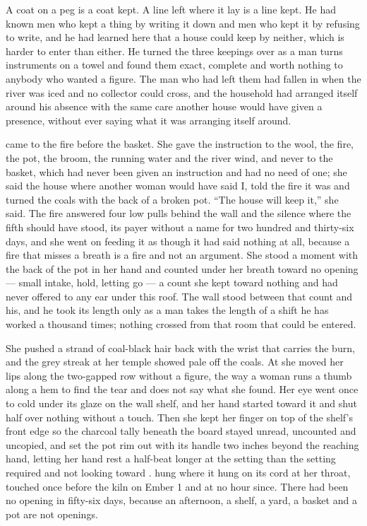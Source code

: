 A coat on a peg is a coat kept. A line left where it lay is a line kept. He had known men who kept a thing by writing it down and men who kept it by refusing to write, and he had learned here that a house could keep by neither, which is harder to enter than either. He turned the three keepings over as a man turns instruments on a towel and found them exact, complete and worth nothing to anybody who wanted a figure. The man who had left them had fallen in  when the river was iced and no collector could cross, and the household had arranged itself around his absence with the same care another house would have given a presence, without ever saying what it was arranging itself around.

 came to the fire before the basket. She gave the instruction to the wool, the fire, the pot, the broom, the running water and the river wind, and never to the basket, which had never been given an instruction and had no need of one; she said the house where another woman would have said I, told the fire it was  and turned the coals with the back of a broken pot. “The house will keep it,” she said. The fire answered four low pulls behind the wall and the silence where the fifth should have stood, its payer without a name for two hundred and thirty-six days, and she went on feeding it as though it had said nothing at all, because a fire that misses a breath is a fire and not an argument. She stood a moment with the back of the pot in her hand and counted under her breath toward no opening --- small intake, hold, letting go --- a count she kept toward nothing and had never offered to any ear under this roof. The wall stood between that count and his, and he took its length only as a man takes the length of a shift he has worked a thousand times; nothing crossed from that room that could be entered.

She pushed a strand of coal-black hair back with the wrist that carries the burn, and the grey streak at her temple showed pale off the coals. At  she moved her lips along the two-gapped row without a figure, the way a woman runs a thumb along a hem to find the tear and does not say what she found. Her eye went once to  cold under its glaze on the wall shelf, and her hand started toward it and shut half over nothing without a touch. Then she kept her finger on top of the shelf's front edge so the charcoal tally beneath the board stayed unread, uncounted and uncopied, and set the pot rim out with its handle two inches beyond the reaching hand, letting her hand rest a half-beat longer at the setting than the setting required and not looking toward .  hung where it hung on its cord at her throat, touched once before the kiln on Ember 1 and at no hour since. There had been no opening in fifty-six days, because an afternoon, a shelf, a yard, a basket and a pot are not openings.

